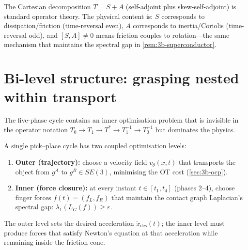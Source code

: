 \begin{remark}[Connection to the paper's $T = S + A$ decomposition]
\label{rem:m-cartesian}
The Cartesian decomposition $T = S + A$ (self-adjoint plus
skew-self-adjoint) is standard operator theory.  The physical
content is: $S$ corresponds to dissipation/friction (time-reversal
even), $A$ corresponds to inertia/Coriolis (time-reversal odd),
and $[S, A] \neq 0$ means friction couples to rotation---the
same mechanism that maintains the spectral gap in
\cref{rem:3b-superconductor}.
\end{remark}


\section{Bi-level structure: grasping nested within transport}
\label{sec:m-bilevel}

The five-phase cycle contains an inner optimisation problem that
is invisible in the operator notation
$T_0 \to T_1 \to T^* \to T_1^{-1} \to T_0^{-1}$ but dominates
the physics.

\begin{definition}\label{def:m-bilevel}
A single pick--place cycle has two coupled optimisation levels:
\begin{enumerate}[label=(\roman*),nosep]
  \item \textbf{Outer (trajectory):} choose a velocity field
  $v_\theta(x,t)$ that transports the object from $g^A$ to
  $g^B \in SE(3)$, minimising the OT cost
  (\cref{sec:3b-ocp}).
  \item \textbf{Inner (force closure):} at every instant
  $t \in [t_1, t_4]$ (phases 2--4), choose finger forces
  $f(t) = (f_L, f_R)$ that maintain the contact graph Laplacian's
  spectral gap: $\lambda_1(L_G(f)) \geq \varepsilon$.
\end{enumerate}
The outer level sets the desired acceleration $\ddot{x}_\mathrm{des}(t)$;
the inner level must produce forces that satisfy Newton's equation at
that acceleration while remaining inside the friction cone.
\end{definition}

